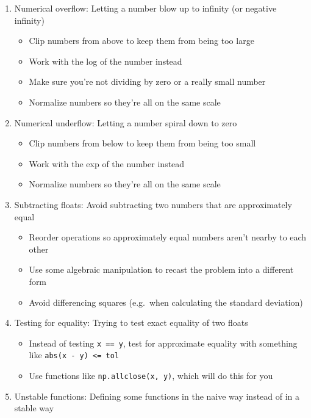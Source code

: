 \documentclass[
  letterpaper,
  DIV=11,
  numbers=noendperiod]{scrreprt}
\providecommand{\tightlist}{%
  \setlength{\itemsep}{0pt}\setlength{\parskip}{0pt}}\usepackage{longtable,booktabs,array}
\begin{document}
\begin{enumerate}
\def\labelenumi{\arabic{enumi}.}
\tightlist
\item
  Numerical overflow: Letting a number blow up to infinity (or negative
  infinity)

  \begin{itemize}
  \tightlist
  \item
    Clip numbers from above to keep them from being too large
  \item
    Work with the log of the number instead
  \item
    Make sure you're not dividing by zero or a really small number
  \item
    Normalize numbers so they're all on the same scale
  \end{itemize}
\item
  Numerical underflow: Letting a number spiral down to zero

  \begin{itemize}
  \tightlist
  \item
    Clip numbers from below to keep them from being too small
  \item
    Work with the exp of the number instead
  \item
    Normalize numbers so they're all on the same scale
  \end{itemize}
\item
  Subtracting floats: Avoid subtracting two numbers that are
  approximately equal

  \begin{itemize}
  \tightlist
  \item
    Reorder operations so approximately equal numbers aren't nearby to
    each other
  \item
    Use some algebraic manipulation to recast the problem into a
    different form
  \item
    Avoid differencing squares (e.g.~when calculating the standard
    deviation)
  \end{itemize}
\item
  Testing for equality: Trying to test exact equality of two floats

  \begin{itemize}
  \tightlist
  \item
    Instead of testing \texttt{x\ ==\ y}, test for approximate equality
    with something like \texttt{abs(x\ -\ y)\ \textless{}=\ tol}
  \item
    Use functions like \texttt{np.allclose(x,\ y)}, which will do this
    for you
  \end{itemize}
\item
  Unstable functions: Defining some functions in the naive way instead
  of in a stable way


\end{enumerate}
\end{document}
